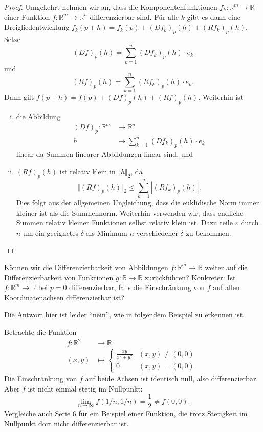\documentclass[../main.tex]{subfiles}
\begin{document}
\begin{proof}
  Umgekehrt nehmen wir an, dass die Komponentenfunktionen
  $f_k \colon \mathbb{R}^m \to \mathbb{R}$
  einer Funktion $f \colon \mathbb{R}^m \to \mathbb{R}^n$ 
  differenzierbar sind.
  Für alle $k$ gibt es dann eine Dreigliedentwicklung
  \(
    f_k(p + h) = f_k(p) + {(Df_k)}_p(h) + {(Rf_k)}_p(h).
  \)
  Setze
  \[
    {(Df)}_p(h) = \sum_{k=1}^{n} {(Df_k)}_p(h) \cdot e_k
  \]
  und
  \[
    {(Rf)}_p(h) = \sum_{k=1}^{n} {(Rf_k)}_p(h) \cdot e_k.
  \]
  Dann gilt
  \(
    f(p + h) = f(p) + {(Df)}_p(h) + {(Rf)}_p(h).
  \)
  Weiterhin ist
  \begin{enumerate}[(i)]
    \item die Abbildung
      \begin{align*}
        {(Df)}_p \colon \mathbb{R}^m & \to \mathbb{R}^n \\
        h & \mapsto \sum_{k=1}^{n} {(Df_k)}_p(h) \cdot e_k
      \end{align*}
      linear da Summen linearer Abbildungen linear sind, und
    \item ${(Rf)}_p(h)$ ist relativ klein in $\Vert h \Vert_2$,
      da
      \[
        \Vert {(Rf)}_p(h) \Vert_2 \leq \sum_{k=1}^{n} |{(Rf_k)}_p(h)|.
      \]
      Dies folgt aus der allgemeinen Ungleichung, dass
      die euklidische Norm immer kleiner ist als die Summennorm.
      Weiterhin verwenden wir, dass endliche Summen
      relativ kleiner Funktionen selbst relativ klein ist.
      Dazu teile $\varepsilon$ durch $n$ um ein geeignetes
      $\delta$ als Minimum $n$ verschiedener $\delta$ zu bekommen.
      \qedhere
  \end{enumerate}
\end{proof}

\begin{question}
  Können wir die Differenzierbarkeit von Abbildungen
  $f \colon \mathbb{R}^m \to \mathbb{R}$ weiter 
  auf die Differenzierbarkeit von Funktionen
  $g \colon \mathbb{R} \to \mathbb{R}$ zurückführen?
  Konkreter: Ist $f \colon \mathbb{R}^m \to \mathbb{R}$ 
  bei $p = 0$ differenzierbar, falls die Einschränkung
  von $f$ auf allen Koordinatenachsen differenzierbar ist?
\end{question}

Die Antwort hier ist leider ``nein'', wie in folgendem
Beispiel zu erkennen ist.

\begin{example}
  Betrachte die Funktion
  \begin{align*}
    f \colon \mathbb{R}^2 & \to \mathbb{R} \\
    (x, y) & \mapsto 
    \begin{cases}
      \frac{xy}{x^2 + y^2} & (x, y) \neq (0, 0) \\
      0 & (x, y) = (0, 0).
    \end{cases}
  \end{align*}
  Die Einschränkung von $f$ auf beide Achsen ist identisch null,
  also differenzierbar. Aber $f$ ist nicht einmal stetig im Nullpunkt:
  \[
    \lim_{n \to \infty} f(1/n, 1/n) = \frac{1}{2} \neq f(0, 0).
  \]
  Vergleiche auch Serie 6 für ein Beispiel einer Funktion, die
  trotz Stetigkeit im Nullpunkt dort nicht differenzierbar ist.
\end{example}
\end{document}
